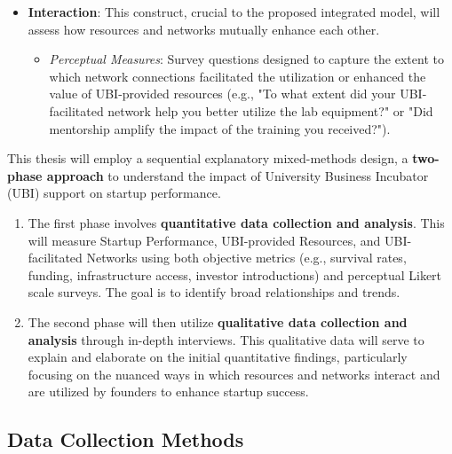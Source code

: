\documentclass[../Main.tex]{subfiles}
\begin{document}
\begin{itemize}
\begin{itemize}
    \end{itemize}
    \item \textbf{Interaction}: This construct, crucial to the proposed integrated model, will assess how resources and networks mutually enhance each other.
    \begin{itemize}
        \item \textit{Perceptual Measures}: Survey questions designed to capture the extent to which network connections facilitated the utilization or enhanced the value of UBI-provided resources (e.g., "To what extent did your UBI-facilitated network help you better utilize the lab equipment?" or "Did mentorship amplify the impact of the training you received?").
    \end{itemize}
\end{itemize}

\begin{condensed_idea}
    This thesis will employ a sequential explanatory mixed-methods design, a \textbf{two-phase approach} to understand the impact of University Business Incubator (UBI) support on startup performance.

    \begin{enumerate}
        \item The first phase involves \textbf{quantitative data collection and analysis}. This will measure Startup Performance, UBI-provided Resources, and UBI-facilitated Networks using both objective metrics (e.g., survival rates, funding, infrastructure access, investor introductions) and perceptual Likert scale surveys. The goal is to identify broad relationships and trends.

        \item The second phase will then utilize \textbf{qualitative data collection and analysis} through in-depth interviews. This qualitative data will serve to explain and elaborate on the initial quantitative findings, particularly focusing on the nuanced ways in which resources and networks interact and are utilized by founders to enhance startup success.
    \end{enumerate}
\end{condensed_idea}


\subsection{Data Collection Methods}
\end{document}
